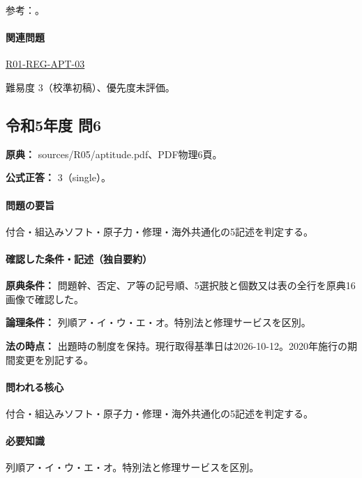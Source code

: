 \par 参考：\cite{pl_statute,pl_qa,pl_definitions2018}。

\paragraph{関連問題} \hyperref[q:r01-reg-apt-03]{R01-REG-APT-03}

\par 難易度 3（校準初稿）、優先度未評価。

\subsection{令和5年度 問6}
\label{q:r05-reg-apt-06}

\noindent\textbf{原典：} sources/R05/aptitude.pdf、PDF物理6頁。

\textbf{公式正答：} 3（single）。

\paragraph{問題の要旨} 付合・組込みソフト・原子力・修理・海外共通化の5記述を判定する。

\paragraph{確認した条件・記述（独自要約）}\mbox{}\par

\noindent\textbf{原典条件：} 問題幹、否定、ア等の記号順、5選択肢と個数又は表の全行を原典16画像で確認した。\par

\noindent\textbf{論理条件：} 列順ア・イ・ウ・エ・オ。特別法と修理サービスを区別。\par

\noindent\textbf{法の時点：} 出題時の制度を保持。現行取得基準日は2026-10-12。2020年施行の期間変更を別記する。\par

\paragraph{問われる核心} 付合・組込みソフト・原子力・修理・海外共通化の5記述を判定する。

\paragraph{必要知識} 列順ア・イ・ウ・エ・オ。特別法と修理サービスを区別。

